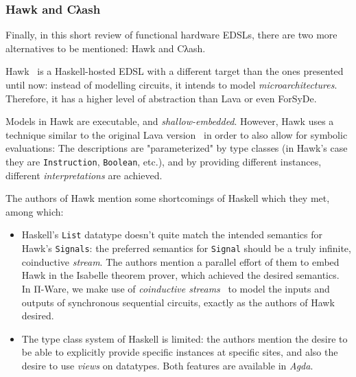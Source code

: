             \subsubsection{Hawk and Cλash}
            \label{subsubsec:hawk-clash}
            Finally, in this short review of functional hardware \acp{EDSL},
            there are two more alternatives to be mentioned: Hawk and Cλash.

            Hawk~\cite{hawk-haskell} is a Haskell-hosted \ac{EDSL} with a different target than
            the ones presented until now: instead of modelling circuits, it intends to model \emph{microarchitectures}.
            Therefore, it has a higher level of abstraction than Lava or even ForSyDe.

            Models in Hawk are executable, and \emph{shallow-embedded}.
            However, Hawk uses a technique similar to the original Lava version~\cite{lava-1999}
            in order to also allow for symbolic evaluations:
            The descriptions are "parameterized" by type classes
            (in Hawk's case they are \texttt{Instruction}, \texttt{Boolean}, etc.),
            and by providing different instances, different \emph{interpretations} are achieved.

            The authors of Hawk mention some shortcomings of Haskell which they met, among which:

            \begin{itemize}
                \item Haskell's \texttt{List} datatype doesn't quite match
                    the intended semantics for Hawk's \texttt{Signals}:
                    the preferred semantics for \texttt{Signal} should be a truly infinite, coinductive \emph{stream}.
                    The authors mention a parallel effort of them to embed Hawk in the Isabelle theorem prover,
                    which achieved the desired semantics.
                    In Π-Ware, we make use of \emph{coinductive streams}~\cite{introduction-coalgebra-jacobs}
                    to model the inputs and outputs of synchronous sequential circuits,
                    exactly as the authors of Hawk desired.
                \item The type class system of Haskell is limited: the authors mention the desire to be able
                    to explicitly provide specific instances at specific sites,
                    and also the desire to use \emph{views} on datatypes.
                    Both features are available in \emph{Agda}.
            \end{itemize}

